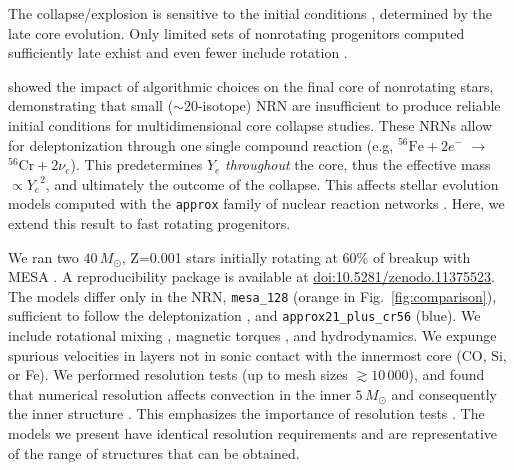 \documentclass[twocolumn]{aastex63}
\DeclareRobustCommand{\Figref}[1]{Fig.~\ref{#1}}
\begin{document}
The collapse/explosion is sensitive to the initial conditions
\citep[e.g.,][]{ott:18, kuroda:18, burrows:23, nakamura:24},
determined by the late core evolution. Only limited sets of
nonrotating progenitors computed sufficiently late exhist
\citep{woosley:02, sukhbold:16, farmer:16, renzo:17, wang:24} and even
fewer include rotation \citep{heger:00,
  aguilera-dena:18}.

\cite{farmer:16} showed the impact of algorithmic choices on the final
core of nonrotating stars, demonstrating that small
($\sim{}20$-isotope) NRN are insufficient to produce reliable initial
conditions for multidimensional core collapse studies. These NRNs
allow for deleptonization through one single compound reaction (e.g,
$^{56}\mathrm{Fe}+2e^{-}$ $\rightarrow$ $^{56}\mathrm{Cr}+2\nu_{e}$).
This predetermines $Y_e$ \emph{throughout} the core, thus
the effective \cite{chandrasekhar:31} mass $\propto {Y_e}^2$, and
ultimately the outcome of the collapse. This affects stellar evolution
models computed with the \texttt{approx} family of nuclear reaction
networks \citep{timmes:00}. Here, we extend this result to fast
rotating progenitors.

We ran two $40\,M_\odot$, Z=0.001 stars initially rotating at 60\% of
breakup with MESA \citep[][r24.03.1]{jermyn:23}. A reproducibility
package is available at
\href{https://doi.org/10.5281/zenodo.11375523}{doi:10.5281/zenodo.11375523}.
The models differ only in the NRN, \texttt{mesa\_128} (orange in
\Figref{fig:comparison}), sufficient to follow the deleptonization
\citep{farmer:16}, and \texttt{approx21\_plus\_cr56} (blue). We
include rotational mixing \citep{heger:00}, magnetic torques
\citep{spruit:02}, and hydrodynamics. We expunge spurious velocities
in layers not in sonic contact with the innermost core (CO, Si, or
Fe). We performed resolution tests (up to mesh sizes
$\gtrsim 10\,000$), and found that numerical resolution affects
convection in the inner $5\,M_\odot$ and consequently the inner
structure \citep[e.g.,][]{sukhbold:14, schneider:23}. This emphasizes
the importance of resolution tests \citep{farmer:16, farag:22}. The models we
present have identical resolution requirements and are representative
of the range of structures that can be obtained.
\end{document}
